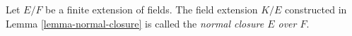 \begin{definition}
\label{definition-normal-closure}
Let $E/F$ be a finite extension of fields. The field extension $K/E$
constructed in Lemma \ref{lemma-normal-closure}
is called the {\it normal closure $E$ over $F$}.
\end{definition}